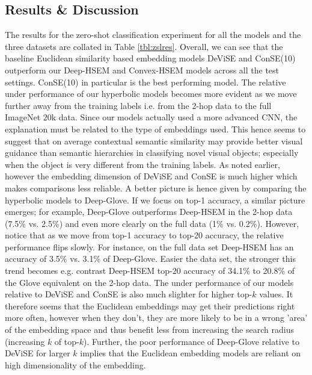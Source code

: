 \documentclass[12pt]{report}
\begin{document}
\subsection{Results \& Discussion}
The results for the zero-shot classification experiment for all the models and the three datasets are collated in Table \ref{tbl:zslres}. Overall, we can see that the baseline Euclidean similarity based embedding models DeViSE and ConSE(10) outperform our Deep-HSEM and Convex-HSEM models across all the test settings. ConSE(10) in particular is the best performing model. The relative under performance of our hyperbolic models becomes more evident as we move further away from the training labels i.e. from the 2-hop data to the full ImageNet 20k data. Since our models actually used a more advanced CNN, the explanation must be related to the type of embeddings used. This hence seems to suggest that on average contextual semantic similarity may provide better visual guidance than semantic hierarchies in classifying novel visual objects; especially when the object is very different from the training labels. As noted earlier, however the embedding dimension of DeViSE and ConSE is much higher which makes comparisons less reliable. A better picture is hence given by comparing the hyperbolic models to Deep-Glove. If we focus on top-1 accuracy, a similar picture emerges; for example, Deep-Glove outperforms Deep-HSEM in the 2-hop data (7.5\% vs. 2.5\%) and even more clearly on the full data (1\% vs. 0.2\%). However, notice that as we move from top-1 accuracy to top-20 accuracy, the relative performance flips slowly. For instance, on the full data set Deep-HSEM has an accuracy of 3.5\% vs. 3.1\% of Deep-Glove. Easier the data set, the stronger this trend becomes e.g. contrast Deep-HSEM top-20 accuracy of 34.1\% to 20.8\% of the Glove equivalent on the 2-hop data. The under performance of our models relative to DeViSE and ConSE is also much slighter for higher top-$k$ values. It therefore seems that the Euclidean embeddings may get their predictions right more often, however when they don't, they are more likely to be in a wrong 'area' of the embedding space and thus benefit less from increasing the search radius (increasing $k$ of top-$k$). Further, the poor performance of Deep-Glove relative to DeViSE for larger $k$ implies that the Euclidean embedding models are reliant on high dimensionality of the embedding.
\end{document}
